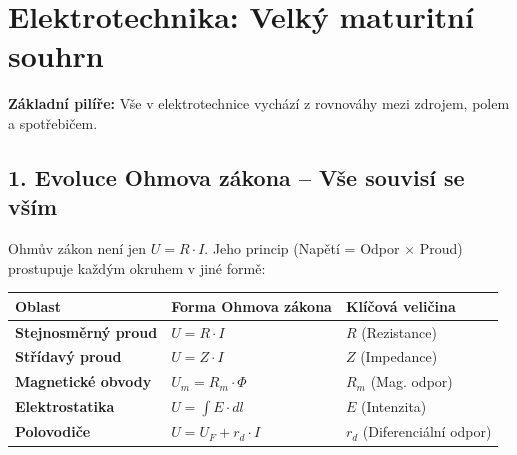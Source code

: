 \documentclass[a4paper,10pt]{article}
\begin{document}
\section*{\centering \huge Elektrotechnika: Velký maturitní souhrn}

\begin{pojmybox}
\centering \textbf{Základní pilíře:} Vše v elektrotechnice vychází z rovnováhy mezi zdrojem, polem a spotřebičem.
\end{pojmybox}

\subsection*{1. Evoluce Ohmova zákona – Vše souvisí se vším}

Ohmův zákon není jen $U=R \cdot I$. Jeho princip (Napětí = Odpor $\times$ Proud) prostupuje každým okruhem v jiné formě:

\begin{center}
\begin{tabularx}{\linewidth}{l X l}
\toprule
\textbf{Oblast} & \textbf{Forma Ohmova zákona} & \textbf{Klíčová veličina} \\
\midrule
\textbf{Stejnosměrný proud} & $U = R \cdot I$ & $R$ (Rezistance) \\
\textbf{Střídavý proud} & $U = Z \cdot I$ & $Z$ (Impedance) \\
\textbf{Magnetické obvody} & $U_m = R_m \cdot \Phi$ & $R_m$ (Mag. odpor) \\
\textbf{Elektrostatika} & $U = \int E \cdot dl$ & $E$ (Intenzita) \\
\textbf{Polovodiče} & $U = U_F + r_d \cdot I$ & $r_d$ (Diferenciální odpor) \\
\bottomrule
\end{tabularx}
\end{center}
\end{document}
